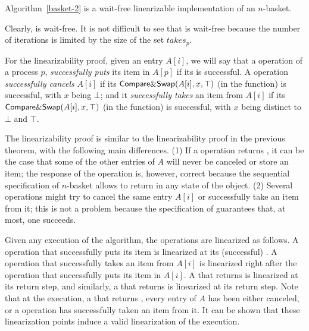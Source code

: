 \begin{theorem}\label{theorem:N-basket}
Algorithm~\ref{basket-2} is a wait-free linearizable implementation of an $n$-basket.
\end{theorem}

\begin{proofT}
Clearly, \Put is wait-free. It is not difficult to see that \Take is wait-free because the number of iterations is limited by the size of the set \(takes_p\).

For the linearizability proof, given an entry $A[i]$, we will say that a \Put operation of a process $p$, \emph{successfully puts} its item in $A[p]$ if its \CAS is successful. A \Take operation \emph{successfully cancels} $A[i]$ if its ${\sf Compare\&Swap}(A[i], x, \top)$ (in the \compete function) is successful, with $x$ being $\bot$; and it \emph{successfully takes} an item from $A[i]$ if its ${\sf Compare\&Swap}(A[i], x, \top)$ (in the \compete function) is successful, with $x$ being distinct to $\bot$ and $\top$.

The linearizability proof is similar to the linearizability proof in the previous theorem, with the following main differences. (1) If a \Put operation returns \full, it can be the case that some of the other entries of $A$ will never be canceled or store an item; the response of the \Put operation is, however, correct because the sequential specification of $n$-basket allows \Put to return \full in any state of the object. (2) Several \Take operations might try to cancel the same entry $A[i]$ or successfully take an item from it; this is not a problem because the specification of \CAS guarantees that, at most, one succeeds.

Given any execution of the algorithm, the operations are linearized as follows. A \Put operation that successfully puts its item is linearized at its (successful) \CAS. A \Take operation that successfully takes an item from $A[i]$ is linearized right after the \Put operation that successfully puts its item in $A[i]$. A \Put that returns \full is linearized at its return step, and similarly, a \Take that returns \closed is linearized at its return step. Note that at the execution, a \Take that returns \closed, every entry of $A$ has been either canceled, or a \Take operation has successfully taken an item from it. It can be shown that these linearization points induce a valid linearization of the execution.
\end{proofT}

